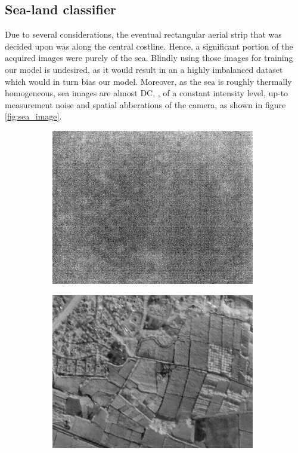 \subsection{Sea-land classifier}
Due to several considerations, the eventual rectangular aerial strip that was decided upon was along the central costline.
Hence, a significant portion of the acquired images were purely of the sea.
Blindly using those images for training our model is undesired, as it would result in an a highly imbalanced dataset which would in turn bias our model.
Moreover, as the sea is roughly thermally homogeneous, sea images are almost DC, \ie, of a constant intensity level, up-to measurement noise and spatial abberations of the camera, as shown in figure \ref{fig:sea_image}.
\begin{figure}[H]
    \begin{subfigure}[b]{0.49\textwidth}
        \centering
        \includegraphics[width=\textwidth]{../figs/data/sea.png}
        \label{fig:sea}
    \end{subfigure}
    \hfill
    \begin{subfigure}[b]{0.49\textwidth}
        \centering
        \includegraphics[width=\textwidth]{../figs/data/land.png}

\end{subfigure}
\end{figure}
